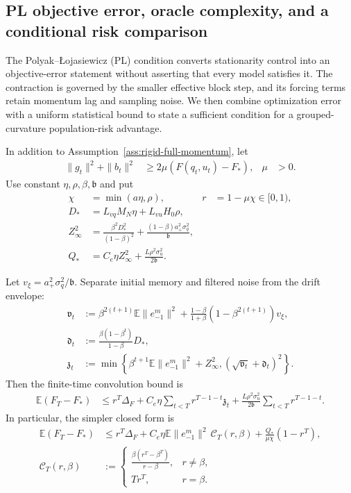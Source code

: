 \subsection{PL objective error, oracle complexity, and a conditional risk comparison}
\label{app:rigid-combined}
The Polyak--\L{}ojasiewicz (PL) condition \citep{karimi2016pl} converts stationarity control into an objective-error statement without asserting that every model satisfies it. The contraction is governed by the smaller effective block step, and its forcing terms retain momentum lag and sampling noise. We then combine optimization error with a uniform statistical bound to state a sufficient condition for a grouped-curvature population-risk advantage.
\begin{assumption}
In addition to Assumption~\ref{ass:rigid-full-momentum}, let
\begin{align}
 \|g_t\|^2+\|b_t\|^2&\ge2\mu(F(q_t,u_t)-F_*),&\mu&>0.
\end{align}
Use constant $\eta,\rho,\beta,\mathfrak b$ and put
\begin{align}
 \chi&=\min(a\eta,\rho),&r&=1-\mu\chi\in[0,1),\\
 D_*&=L_{vq}M_N\eta+L_{vu}H_0\rho,\\
 Z_\infty^2&=\frac{\beta^2D_*^2}{(1-\beta)^2}+
 \frac{(1-\beta)a_+^2\sigma_q^2}{\mathfrak b},\\
 Q_*&=C_e\eta Z_\infty^2+\frac{L\rho^2\sigma_u^2}{2\mathfrak b}.
\end{align}
\end{assumption}
\begin{theorem}
\label{thm:rigid-joint-pl}
Let $v_\xi=a_+^2\sigma_q^2/\mathfrak b$. Separate initial memory and filtered noise from the drift envelope:
\begin{align}
 \mathfrak v_t&:=\beta^{2(t+1)}\mathbb E\|e_{-1}^m\|^2+
 \frac{1-\beta}{1+\beta}(1-\beta^{2(t+1)})v_\xi,\\
 \mathfrak d_t&:=\frac{\beta(1-\beta^t)}{1-\beta}D_*,\\
 \mathfrak z_t&:=\min\left\{\beta^{t+1}\mathbb E\|e_{-1}^m\|^2+Z_\infty^2,
 (\sqrt{\mathfrak v_t}+\mathfrak d_t)^2\right\}.
\end{align}
Then the finite-time convolution bound is
\begin{align}\label{eq:sharp-pl-convolution}
 \mathbb E(F_T-F_*)
 &\le r^T\Delta_F+C_e\eta\sum_{t<T}r^{T-1-t}\mathfrak z_t
 +\frac{L\rho^2\sigma_u^2}{2\mathfrak b}\sum_{t<T}r^{T-1-t}.
\end{align}
In particular, the simpler closed form is
\begin{align}
 \mathbb E(F_T-F_*)
 &\le r^T\Delta_F+
 C_e\eta\mathbb E\|e_{-1}^m\|^2\,\mathcal C_T(r,\beta)+
 \frac{Q_*}{\mu\chi}(1-r^T),\\
 \mathcal C_T(r,\beta)
 &:=\begin{cases}
 \displaystyle\frac{\beta(r^T-\beta^T)}{r-\beta},&r\ne\beta,\\[5pt]
 Tr^T,&r=\beta.
 \end{cases}
\end{align}
\end{theorem}
